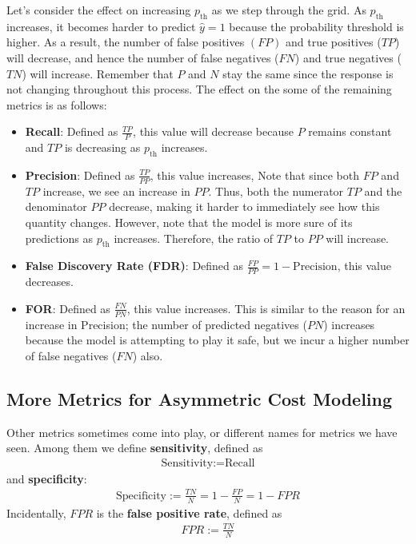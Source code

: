 \documentclass[12pt, a4paper]{article}
\theoremstyle{definition}
\begin{document}
	Let's consider the effect on increasing $p_{\text{th}}$ as we step through
	the grid. As $p_{\text{th}}$ increases, it becomes harder to predict
	$\hat{y} = 1$ because the probability threshold is higher. As a result,
	the number of false positives $(FP)$ and true positives ($TP$) will decrease,
	and hence the number of false negatives ($FN$) and true negatives ($TN$) will
	increase. Remember that $P$ and $N$ stay the same since the response is not
	changing throughout this process. The effect on the some of the remaining metrics
	is as follows:
	\begin{itemize}
		\item \textbf{Recall}: Defined as $\frac{TP}{P}$, this value will decrease
		because $P$ remains constant and $TP$ is decreasing as $p_{\text{th}}$ increases.
		\item \textbf{Precision}: Defined as $\frac{TP}{PP}$, this value increases,
		Note that since both $FP$ and $TP$ increase, we see an increase in $PP$.
		Thus, both the numerator $TP$ and the denominator $PP$ decrease,
		making it harder to immediately see how this quantity changes. However,
		note that the model is more sure of its predictions as $p_{\text{th}}$
		increases. Therefore, the ratio of $TP$ to $PP$ will increase.
		\item \textbf{False Discovery Rate (FDR)}: Defined as $\frac{FP}{PP} = 1 - \text{Precision}$, this value decreases.
		\item \textbf{FOR}: Defined as $\frac{FN}{PN}$, this value increases.
		This is similar to the reason for an increase in Precision; the number
		of predicted negatives ($PN$) increases because the model is attempting
		to play it safe, but we incur a higher number of false negatives ($FN$)
		also.
	\end{itemize}
	\subsection{More Metrics for Asymmetric Cost Modeling}
	Other metrics sometimes come into play, or different names for
	metrics we have seen. Among them we define \textbf{sensitivity},
	defined as
	\begin{align*}
		\text{Sensitivity} := \text{Recall}
	\end{align*}
	and \textbf{specificity}:
	\begin{align*}
		\text{Specificity} := \frac{TN}{N} = 1 - \frac{FP}{N} = 1 - FPR
	\end{align*}
	Incidentally, $FPR$ is the \textbf{false positive rate}, defined as
	\begin{align*}
		FPR := \frac{TN}{N}
	\end{align*}
\end{document}

